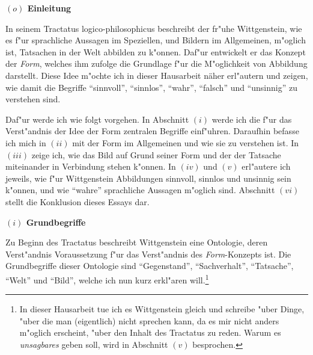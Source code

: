 \documentclass[a4paper, emulatestandardclasses, 12pt]{scrartcl}
\begin{document}
\begin{onehalfspace} 



\noindent\textbf{$(o)$ Einleitung}

\noindent In seinem Tractatus logico-philosophicus \citep{wittgenstein1963tractatus} beschreibt der fr"uhe Wittgenstein, wie es f"ur sprachliche Aussagen im Speziellen, und Bildern im Allgemeinen, m"oglich ist, Tatsachen in der Welt abbilden zu k"onnen. Daf"ur entwickelt er das Konzept der \emph{Form}, welches ihm zufolge die Grundlage f"ur die M"oglichkeit von Abbildung darstellt. Diese Idee m"ochte ich in dieser Hausarbeit näher erl"autern und zeigen, wie damit die Begriffe "`sinnvoll"', "`sinnlos"', "`wahr"', "`falsch"' und "`unsinnig"' zu verstehen sind.

Daf"ur werde ich wie folgt vorgehen. In Abschnitt $(i)$ werde ich die f"ur das Verst"andnis der Idee der Form zentralen Begriffe einf"uhren. Daraufhin befasse ich mich in $(ii)$ mit der Form im Allgemeinen und wie sie zu verstehen ist. In $(iii)$ zeige ich, wie das Bild auf Grund seiner Form und der der Tatsache miteinander in Verbindung stehen k"onnen. In $(iv)$ und $(v)$ erl"autere ich jeweils, wie f"ur Wittgenstein Abbildungen sinnvoll, sinnlos und unsinnig sein k"onnen, und wie "`wahre"' sprachliche Aussagen m"oglich sind. Abschnitt $(vi)$ stellt die Konklusion dieses Essays dar.
\vspace{5mm}



\noindent\textbf{$(i)$ Grundbegriffe}

\noindent Zu Beginn des Tractatus beschreibt Wittgenstein eine Ontologie, deren Verst"andnis Voraussetzung f"ur das Verst"andnis des \emph{Form}-Konzepts ist. Die Grundbegriffe dieser Ontologie sind "`Gegenstand"', "`Sachverhalt"', "`Tatsache"', "`Welt"' und "`Bild"', welche ich nun kurz erkl"aren will.\footnote{In dieser Hausarbeit tue ich es Wittgenstein gleich und schreibe "uber Dinge, "uber die man (eigentlich) nicht sprechen kann, da es mir nicht anders m"oglich erscheint, "uber den Inhalt des Tractatus zu reden. Warum es \emph{unsagbares} geben soll, wird in Abschnitt $(v)$ besprochen.}


\end{onehalfspace}
\end{document}
